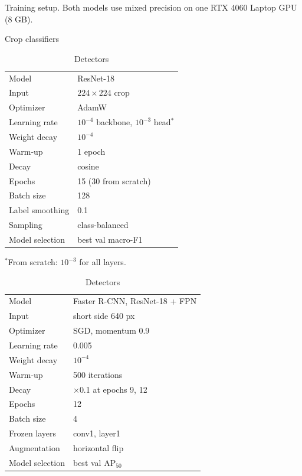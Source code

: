 \begin{table}[H]
\centering
\caption{Training setup. Both models use mixed precision on one RTX 4060 Laptop GPU (8 GB).}
\label{tab:setup}
\small
\begin{subtable}[t]{0.49\linewidth}
\centering
\caption{Crop classifiers}
\begin{threeparttable}
\begin{tabular}{@{}ll@{}}
\toprule
Model & ResNet-18 \\
Input & $224 \times 224$ crop \\
Optimizer & AdamW \\
Learning rate & $10^{-4}$ backbone, $10^{-3}$ head$^*$ \\
Weight decay & $10^{-4}$ \\
Warm-up & 1 epoch \\
Decay & cosine \\
Epochs & 15 (30 from scratch) \\
Batch size & 128 \\
Label smoothing & 0.1 \\
Sampling & class-balanced \\
Model selection & best val macro-F1 \\
\bottomrule
\end{tabular}
\par\smallskip
{\footnotesize\noindent $^*$From scratch: $10^{-3}$ for all layers.\par}
\end{threeparttable}
\end{subtable}
\hfill
\begin{subtable}[t]{0.49\linewidth}
\centering
\caption{Detectors}
\begin{threeparttable}
\begin{tabular}{@{}ll@{}}
\toprule
Model & Faster R-CNN, ResNet-18 + FPN \\
Input & short side 640 px \\
Optimizer & SGD, momentum 0.9 \\
Learning rate & 0.005 \\
Weight decay & $10^{-4}$ \\
Warm-up & 500 iterations \\
Decay & $\times$0.1 at epochs 9, 12 \\
Epochs & 12 \\
Batch size & 4 \\
Frozen layers & conv1, layer1 \\
Augmentation & horizontal flip \\
Model selection & best val AP$_{50}$ \\
\bottomrule
\end{tabular}
\end{threeparttable}
\end{subtable}
\end{table}
